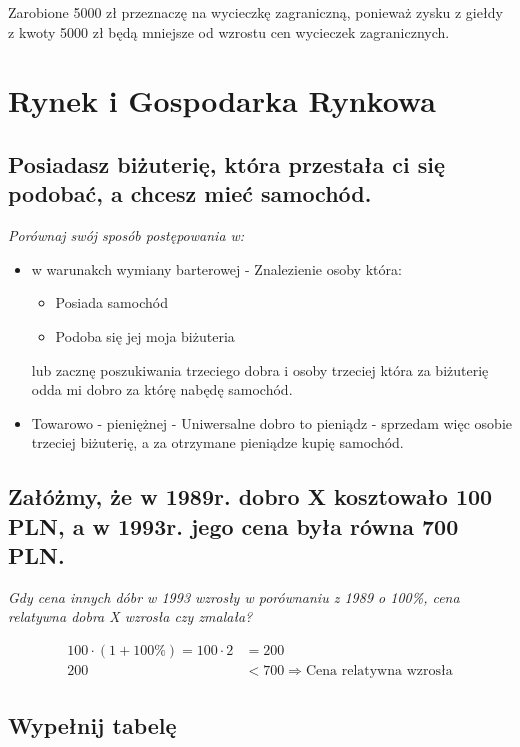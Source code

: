 \documentclass[a4paper,12pt]{article}
\let\oldsection\section
\renewcommand\section{\clearpage\oldsection}
\begin{document}
\vspace{1cm}

Zarobione 5000 zł przeznaczę na wycieczkę zagraniczną, ponieważ zysku z giełdy z kwoty 5000 zł będą mniejsze od wzrostu cen wycieczek zagranicznych.

\section{Rynek i Gospodarka Rynkowa}

\subsection{Posiadasz biżuterię, która przestała ci się podobać, a chcesz mieć samochód.}

\emph{Porównaj swój sposób postępowania w:}

\begin{itemize}
	\item w warunakch wymiany barterowej - Znalezienie osoby która:
	      \begin{itemize}
		      \item Posiada samochód
		      \item Podoba się jej moja biżuteria
	      \end{itemize}
	      lub zacznę poszukiwania trzeciego dobra i osoby trzeciej która za biżuterię odda mi dobro za którę nabędę samochód.
	\item Towarowo - pieniężnej - Uniwersalne dobro to pieniądz - sprzedam więc osobie trzeciej biżuterię, a za otrzymane pieniądze kupię samochód.
\end{itemize}

\subsection{Załóżmy, że w 1989r. dobro X kosztowało 100 PLN, a w 1993r. jego cena była równa 700 PLN.}

\emph{Gdy cena innych dóbr w 1993 wzrosły w porównaniu z 1989 o 100\%, cena relatywna dobra X wzrosła czy zmalała?}

\begin{align*}
	100 \cdot \left(1 + 100 \%\right) = 100 \cdot 2 & = 200                                           \\
	200                                             & < 700 \Rightarrow \text{Cena relatywna wzrosła}
\end{align*}

\subsection{Wypełnij tabelę}
\end{document}
